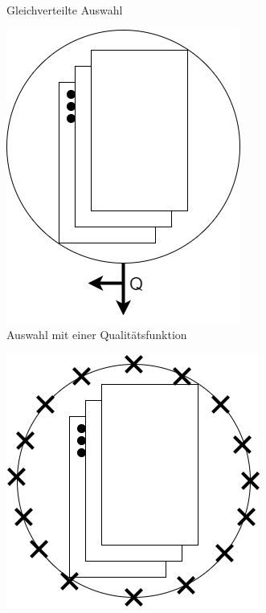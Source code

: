 \begin{figure}[!htb]
\begin{subfigure}{.3\textwidth}
	\caption{Gleichverteilte Auswahl}
	\label{fig:auswahl_gleichverteilt}
\end{subfigure}

\begin{subfigure}{.3\textwidth}
	\centering
	\includegraphics[width=.7\linewidth]{img/rechenberg_notation/auswahl_qualitaetsfunktion.png}
	\caption{Auswahl mit einer Qualitätsfunktion}
	\label{fig:auswahl_qualitaetsfunktion}
\end{subfigure}
\begin{subfigure}{.3\textwidth}
	\centering
	\includegraphics[width=.7\linewidth]{img/rechenberg_notation/population_isoliert.png}

\end{subfigure}
\end{figure}
